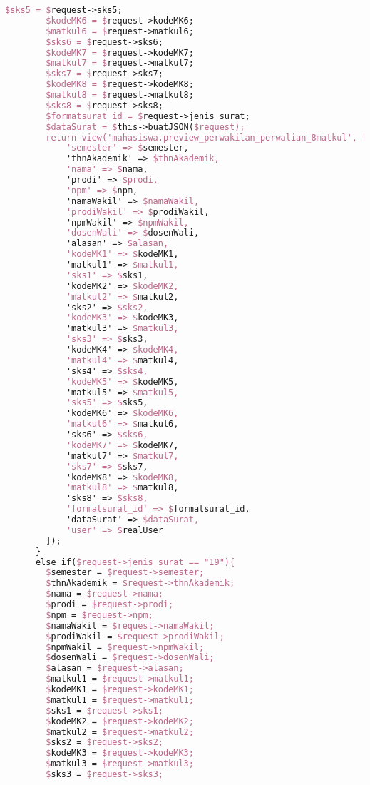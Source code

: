 \begin{lstlisting}[language=tex,basicstyle=\tiny,caption=PesanansuratController.php]
        $sks5 = $request->sks5;
        $kodeMK6 = $request->kodeMK6;
        $matkul6 = $request->matkul6;
        $sks6 = $request->sks6;
        $kodeMK7 = $request->kodeMK7;
        $matkul7 = $request->matkul7;
        $sks7 = $request->sks7;
        $kodeMK8 = $request->kodeMK8;
        $matkul8 = $request->matkul8;
        $sks8 = $request->sks8;
        $formatsurat_id = $request->jenis_surat;
        $dataSurat = $this->buatJSON($request);
        return view('mahasiswa.preview_perwakilan_perwalian_8matkul', [
            'semester' => $semester,
            'thnAkademik' => $thnAkademik,
            'nama' => $nama,
            'prodi' => $prodi,
            'npm' => $npm,
            'namaWakil' => $namaWakil,
            'prodiWakil' => $prodiWakil,
            'npmWakil' => $npmWakil,
            'dosenWali' => $dosenWali,
            'alasan' => $alasan,
            'kodeMK1' => $kodeMK1,
            'matkul1' => $matkul1,
            'sks1' => $sks1,
            'kodeMK2' => $kodeMK2,
            'matkul2' => $matkul2,
            'sks2' => $sks2,
            'kodeMK3' => $kodeMK3,
            'matkul3' => $matkul3,
            'sks3' => $sks3,
            'kodeMK4' => $kodeMK4,
            'matkul4' => $matkul4,
            'sks4' => $sks4,
            'kodeMK5' => $kodeMK5,
            'matkul5' => $matkul5,
            'sks5' => $sks5,
            'kodeMK6' => $kodeMK6,
            'matkul6' => $matkul6,
            'sks6' => $sks6,
            'kodeMK7' => $kodeMK7,
            'matkul7' => $matkul7,
            'sks7' => $sks7,
            'kodeMK8' => $kodeMK8,
            'matkul8' => $matkul8,
            'sks8' => $sks8,
            'formatsurat_id' => $formatsurat_id,
            'dataSurat' => $dataSurat,
            'user' => $realUser
        ]);
      }
      else if($request->jenis_surat == "19"){
        $semester = $request->semester;
        $thnAkademik = $request->thnAkademik;
        $nama = $request->nama;
        $prodi = $request->prodi;
        $npm = $request->npm;
        $namaWakil = $request->namaWakil;
        $prodiWakil = $request->prodiWakil;
        $npmWakil = $request->npmWakil;
        $dosenWali = $request->dosenWali;
        $alasan = $request->alasan;
        $matkul1 = $request->matkul1;
        $kodeMK1 = $request->kodeMK1;
        $matkul1 = $request->matkul1;
        $sks1 = $request->sks1;
        $kodeMK2 = $request->kodeMK2;
        $matkul2 = $request->matkul2;
        $sks2 = $request->sks2;
        $kodeMK3 = $request->kodeMK3;
        $matkul3 = $request->matkul3;
        $sks3 = $request->sks3;

\end{lstlisting}
